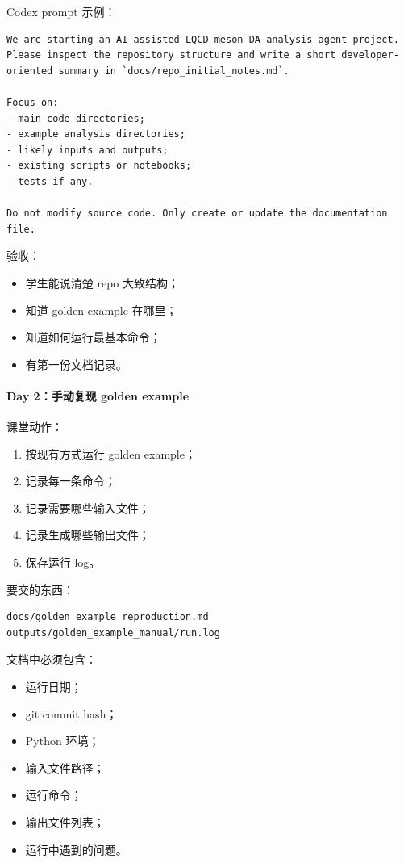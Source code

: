 \documentclass[11pt,a4paper,fontset=fandol]{ctexart}
\begin{document}
Codex prompt 示例：

\begin{lstlisting}
We are starting an AI-assisted LQCD meson DA analysis-agent project.
Please inspect the repository structure and write a short developer-oriented summary in `docs/repo_initial_notes.md`.

Focus on:
- main code directories;
- example analysis directories;
- likely inputs and outputs;
- existing scripts or notebooks;
- tests if any.

Do not modify source code. Only create or update the documentation file.
\end{lstlisting}

验收：

\begin{itemize}[leftmargin=2em]
  \item 学生能说清楚 repo 大致结构；
  \item 知道 golden example 在哪里；
  \item 知道如何运行最基本命令；
  \item 有第一份文档记录。
\end{itemize}

\paragraph{Day 2：手动复现 golden example}

课堂动作：

\begin{enumerate}[leftmargin=2em]
  \item 按现有方式运行 golden example；
  \item 记录每一条命令；
  \item 记录需要哪些输入文件；
  \item 记录生成哪些输出文件；
  \item 保存运行 log。
\end{enumerate}

要交的东西：

\begin{lstlisting}
docs/golden_example_reproduction.md
outputs/golden_example_manual/run.log
\end{lstlisting}

文档中必须包含：

\begin{itemize}[leftmargin=2em]
  \item 运行日期；
  \item git commit hash；
  \item Python 环境；
  \item 输入文件路径；
  \item 运行命令；
  \item 输出文件列表；
  \item 运行中遇到的问题。
\end{itemize}
\end{document}

